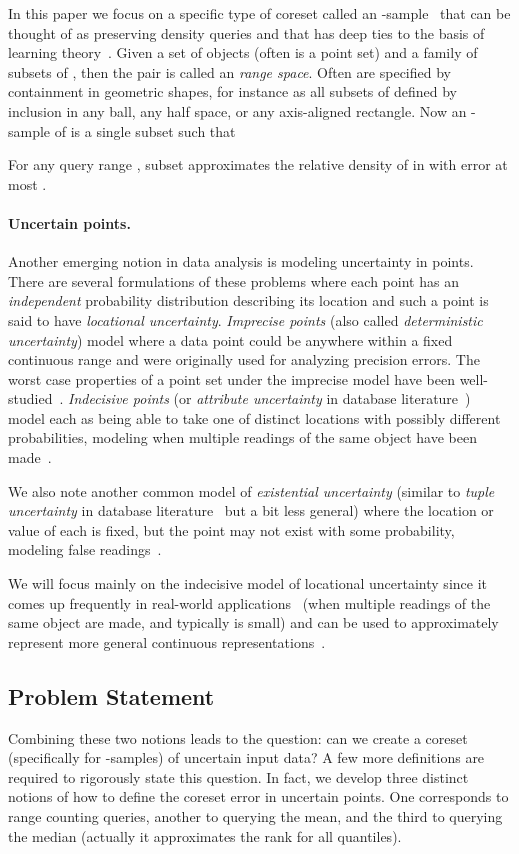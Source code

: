 \documentclass[11pt]{myclass}
\newcommand{\Paragraph}[1]{\paragraph{\sffamily\textbf{#1.}}}
\begin{document}
In this paper we focus on a specific type of coreset called an -sample~\cite{VC71,peled,CM96} that can be thought of as preserving density queries and that has deep ties to the basis of learning theory~\cite{AB99}.  Given a set of objects  (often  is a point set) and a family of subsets  of , then the pair  is called an \emph{range space}.  Often  are specified by containment in geometric shapes, for instance as all subsets of  defined by inclusion in any ball, any half space, or any axis-aligned rectangle.  Now an -sample of  is a single subset  such that 

For any query range , subset  approximates the relative density of  in  with error at most .  

\Paragraph{Uncertain points}
Another emerging notion in data analysis is modeling uncertainty in points.  There are several formulations of these problems where each point  has an \emph{independent} probability distribution  describing its location and such a point is said to have \emph{locational uncertainty}.  
\emph{Imprecise points} (also called \emph{deterministic uncertainty}) model where a data point  could be anywhere within a fixed continuous range and were originally used for analyzing precision errors. The worst case properties of a point set  under the imprecise model have been
well-studied~\cite{gss-egbra-89,gss-cscah-93,bs-ads-04,hm-ticpps-08,ls-dtip-08,nt-teb-00,obj-ue-05,kl-lbbsd-10,k-bmips-08}.
\emph{Indecisive points}  (or \emph{attribute uncertainty} in database literature~\cite{1644250}) model each  as being able to take one of  distinct locations  with possibly different probabilities, modeling when multiple readings of the same object have been made~\cite{JLP11,MDFW00,CLY09,CG09,ACTY09,ABSHNSW06}.  

We also note another common model of \emph{existential uncertainty} (similar to \emph{tuple uncertainty} in database literature~\cite{1644250} but a bit less general) where the location or value of each  is fixed, but the point may not exist with some probability, modeling false readings~\cite{KCS11a,KCS11b,1644250,CLY09}.


We will focus mainly on the indecisive model of locational uncertainty since it comes up frequently in real-world applications~\cite{MDFW00,ABSHNSW06} (when multiple readings of the same object are made, and typically  is small) and can be used to approximately represent more general continuous representations~\cite{JLP12,Phi08}.  

\subsection{Problem Statement}
Combining these two notions leads to the question: can we create a coreset (specifically for -samples) of uncertain input data?  A few more definitions are required to rigorously state this question.  In fact, we develop three distinct notions of how to define the coreset error in uncertain points.  One corresponds to range counting queries, another to querying the mean, and the third to querying the median (actually it approximates the rank for all quantiles).  
\end{document}
